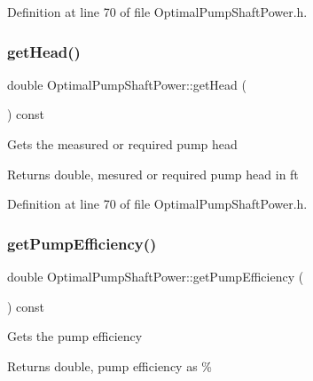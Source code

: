 Definition at line 70 of file Optimal\+Pump\+Shaft\+Power.\+h.

\mbox{\label{class_optimal_pump_shaft_power_abb285a8a256c10187113c34db1a4462b}} 
\subsubsection{\texorpdfstring{get\+Head()}{getHead()}\hspace{0.1cm}{\footnotesize\ttfamily [3/3]}}
{\footnotesize\ttfamily double Optimal\+Pump\+Shaft\+Power\+::get\+Head (\begin{DoxyParamCaption}{ }\end{DoxyParamCaption}) const\hspace{0.3cm}{\ttfamily [inline]}}

Gets the measured or required pump head

\begin{DoxyReturn}{Returns}
double, mesured or required pump head in ft 
\end{DoxyReturn}


Definition at line 70 of file Optimal\+Pump\+Shaft\+Power.\+h.

\mbox{\label{class_optimal_pump_shaft_power_a77b9c639438f9d6008c20948f173a2c4}} 
\subsubsection{\texorpdfstring{get\+Pump\+Efficiency()}{getPumpEfficiency()}\hspace{0.1cm}{\footnotesize\ttfamily [1/3]}}
{\footnotesize\ttfamily double Optimal\+Pump\+Shaft\+Power\+::get\+Pump\+Efficiency (\begin{DoxyParamCaption}{ }\end{DoxyParamCaption}) const\hspace{0.3cm}{\ttfamily [inline]}}

Gets the pump efficiency

\begin{DoxyReturn}{Returns}
double, pump efficiency as \% 
\end{DoxyReturn}



